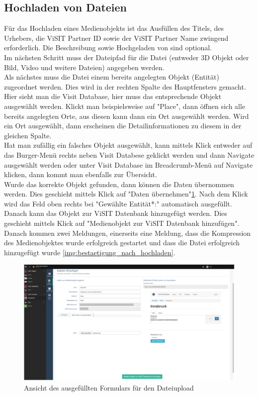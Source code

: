 \subsection{Hochladen von Dateien}

Für das Hochladen eines Medienobjekts ist das Ausfüllen des Titels, des Urhebers, die ViSIT Partner ID sowie der ViSIT Partner Name zwingend erforderlich. Die Beschreibung sowie Hochgeladen von sind optional.\\
Im nächsten Schritt muss der Dateipfad für die Datei (entweder 3D Objekt oder Bild, Video und weitere Dateien) angegeben werden.\\
Als nächstes muss die Datei einem bereits angelegten Objekt (Entität) zugeordnet werden. Dies wird in der rechten Spalte des Hauptfensters gemacht. Hier sieht man die Visit Database, hier muss das entsprechende Objekt ausgewählt werden. Klickt man beispielsweise auf "Place", dann öffnen sich alle bereits angelegten Orte, aus diesen kann dann ein Ort ausgewählt werden. Wird ein Ort ausgewählt, dann erscheinen die Detailinformationen zu diesem in der gleichen Spalte.\\

Hat man zufällig ein falsches Objekt ausgewählt, kann mittels Klick entweder auf das Burger-Menü rechts neben Visit Databese geklickt werden und dann Navigate ausgewählt werden oder unter Visit Database im Breadcrumb-Menü auf Navigate klicken, dann kommt man ebenfalls zur Übersicht.\\

Wurde das korrekte Objekt gefunden, dann können die Daten übernommen werden. Dies geschieht mittels Klick auf "Daten übernehmen"\ref{img:datei_hochladen_ausgefuellt}. Nach dem Klick wird das Feld oben rechts bei "Gewählte Entität*:" automatisch ausgefüllt. Danach kann das Objekt zur ViSIT Datenbank hinzugefügt werden. Dies geschieht mittels Klick auf "Medienobjekt zur ViSIT Datenbank hinzufügen". Danach kommen zwei Meldungen, einerseits eine Meldung, dass die Kompression des Medienobjektes wurde erfolgreich gestartet und dass die Datei erfolgreich hinzugefügt wurde \ref{img:bestaetigung_nach_hochladen}.

\begin{figure}[ht!]
\centering
\includegraphics[width=12cm]{Figures/paula/dateiverwaltung/datei_hochladen_ausgefuellt.png}
\caption{Ansicht des ausgefüllten Formulars für den Dateiupload}
\label{img:datei_hochladen_ausgefuellt}
\end{figure}

